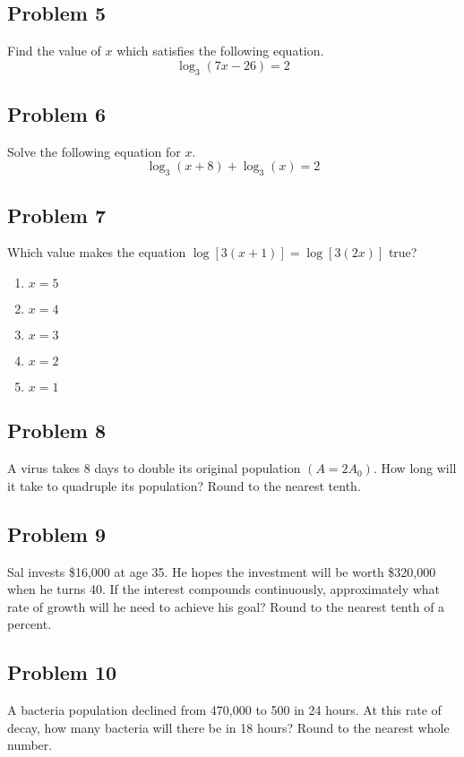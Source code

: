 \documentclass[12pt]{article}
\begin{document}
\subsection*{Problem 5}
Find the value of \( x \) which satisfies the following equation.
\[\log_3(7x-26)=2\]

\subsection*{Problem 6}
Solve the following equation for \(x\).
\[ \log_3(x + 8) + \log_3(x) = 2 \]  

\subsection*{Problem 7}
Which value makes the equation \( \log[3(x + 1)] = \log[3(2x)] \) true?

\begin{enumerate}[label=(\alph*)]
    \item \( x = 5 \)
    \item \( x = 4 \)
    \item \( x = 3 \)
    \item \( x = 2 \)
    \item \( x = 1 \)
\end{enumerate}

\subsection*{Problem 8}
A virus takes 8 days to double its original population \((A=2A_0)\). How long will it take to quadruple its population?  
Round to the nearest tenth.


\subsection*{Problem 9}
Sal invests \$16,000 at age 35. He hopes the investment will be worth \$320,000 when he turns 40.  
If the interest compounds continuously, approximately what rate of growth will he need to achieve his goal?  
Round to the nearest tenth of a percent.


\subsection*{Problem 10}
A bacteria population declined from 470,000 to 500 in 24 hours.  
At this rate of decay, how many bacteria will there be in 18 hours?  
Round to the nearest whole number.
\end{document}
